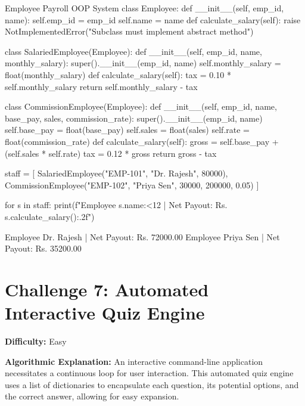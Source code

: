 \begin{pythoncode}{Employee Payroll OOP System}
class Employee:
    def __init__(self, emp_id, name):
        self.emp_id = emp_id
        self.name = name
    def calculate_salary(self):
        raise NotImplementedError("Subclass must implement abstract method")

class SalariedEmployee(Employee):
    def __init__(self, emp_id, name, monthly_salary):
        super().__init__(emp_id, name)
        self.monthly_salary = float(monthly_salary)
    def calculate_salary(self):
        tax = 0.10 * self.monthly_salary
        return self.monthly_salary - tax

class CommissionEmployee(Employee):
    def __init__(self, emp_id, name, base_pay, sales, commission_rate):
        super().__init__(emp_id, name)
        self.base_pay = float(base_pay)
        self.sales = float(sales)
        self.rate = float(commission_rate)
    def calculate_salary(self):
        gross = self.base_pay + (self.sales * self.rate)
        tax = 0.12 * gross
        return gross - tax

staff = [
    SalariedEmployee("EMP-101", "Dr. Rajesh", 80000),
    CommissionEmployee("EMP-102", "Priya Sen", 30000, 200000, 0.05)
]

for s in staff:
    print(f"Employee {s.name:<12} | Net Payout: Rs. {s.calculate_salary():.2f}")
\end{pythoncode}

\begin{outputbox}
Employee Dr. Rajesh   | Net Payout: Rs. 72000.00
Employee Priya Sen    | Net Payout: Rs. 35200.00
\end{outputbox}

\section{Challenge 7: Automated Interactive Quiz Engine}

\textbf{Difficulty:} Easy

\textbf{Algorithmic Explanation:}
An interactive command-line application necessitates a continuous loop for user interaction. This automated quiz engine uses a list of dictionaries to encapsulate each question, its potential options, and the correct answer, allowing for easy expansion. 

